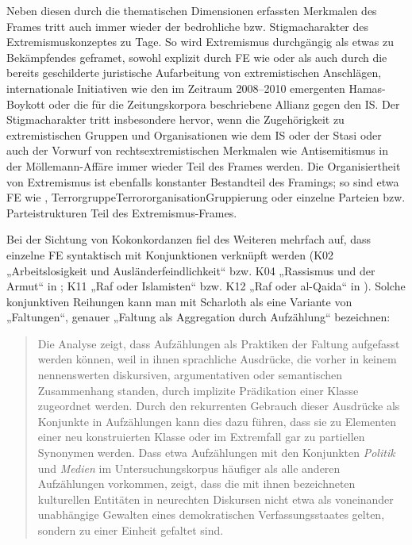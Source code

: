 Neben diesen durch die thematischen Dimensionen erfassten Merkmalen des Frames tritt auch immer wieder der bedrohliche bzw. Stigmacharakter des Extremismuskonzeptes zu Tage. So wird Extremismus durchgängig als etwas zu Bekämpfendes geframet, sowohl explizit durch FE wie  oder  als auch durch die bereits geschilderte juristische Aufarbeitung von extremistischen Anschlägen, internationale Initiativen wie den im Zeitraum 2008--2010 emergenten Hamas-Boykott oder die für die Zeitungskorpora beschriebene Allianz gegen den IS. Der Stigmacharakter tritt insbesondere hervor, wenn die Zugehörigkeit zu extremistischen Gruppen und Organisationen wie dem IS oder der Stasi oder auch der Vorwurf von rechtsextremistischen Merkmalen wie Antisemitismus in der Möllemann-Affäre immer wieder Teil des Frames werden. Die Organisiertheit von Extremismus ist ebenfalls konstanter Bestandteil des Framings; so sind etwa FE wie , Terrorgruppe{\breakbar}Terrororganisation{\breakbar}Gruppierung oder einzelne Parteien bzw. Parteistrukturen Teil des Extremismus-Frames.

Bei der Sichtung von Kokonkordanzen fiel des Weiteren mehrfach auf, dass einzelne FE syntaktisch mit Konjunktionen verknüpft werden (K02 „Arbeitslosigkeit und Ausländerfeindlichkeit`` bzw. K04 „Rassismus und der Armut`` in ; K11 „Raf oder Islamisten`` bzw. K12 „Raf oder al-Qaida`` in ). Solche konjunktiven Reihungen kann man mit Scharloth als eine Variante von „Faltungen``, genauer „Faltung als Aggregation durch Aufzählung`` \autocite*[223]{scharlothFaltungenSchliessungRechten2022} bezeichnen:

\newpage
\begin{quote}
Die Analyse zeigt, dass Aufzählungen als Praktiken der Faltung aufgefasst werden können, weil in ihnen sprachliche Ausdrücke, die vorher in keinem nennenswerten diskursiven, argumentativen oder semantischen Zusammenhang standen, durch implizite Prädikation einer Klasse zugeordnet werden. Durch den rekurrenten Gebrauch dieser Ausdrücke als Konjunkte in Aufzählungen kann dies dazu führen, dass sie zu Elementen einer neu konstruierten Klasse oder im Extremfall gar zu partiellen Synonymen werden. Dass etwa Aufzählungen mit den Konjunkten \emph{Politik} und \emph{Medien} im Untersuchungskorpus häufiger als alle anderen Aufzählungen vorkommen, zeigt, dass die mit ihnen bezeichneten kulturellen Entitäten in neurechten Diskursen nicht etwa als voneinander unabhängige Gewalten eines demokratischen Verfassungsstaates gelten, sondern zu einer Einheit gefaltet sind. \autocite[230]{scharlothFaltungenSchliessungRechten2022}
\end{quote}

